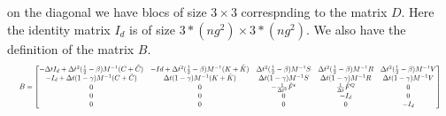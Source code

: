 on the diagonal we have blocs of size  $3 \times 3$ correspnding to the matrix $D$. Here the identity matrix $I_d$ is of size $3*(ng^2) \times 3*(ng^2)$.
We also have the definition of the matrix $B$.
\begin{equation}
\resizebox{\columnwidth}{!}{
$
B = \begin{bmatrix}
 - \Delta t I_d + \Delta t^2 (\frac{1}{2} - \beta) M^{-1} (C+\tilde{C}) & - Id + \Delta t^2 (\frac{1}{2} - \beta) M^{-1}(K+\tilde{K}) & \Delta t^2 (\frac{1}{2} - \beta) M^{-1} S & \Delta t^2 (\frac{1}{2} - \beta) M^{-1} R & \Delta t^2 (\frac{1}{2} - \beta) M^{-1} V \\
-I_d + \Delta t (1-\gamma) M^{-1} (C+\tilde{C})& \Delta t (1-\gamma) M^{-1} (K+\tilde{K}) & \Delta t (1-\gamma) M^{-1} S& \Delta t (1-\gamma) M^{-1} R & \Delta t (1-\gamma) M^{-1} V \\
0 & 0 & -\frac{1}{\Delta t^2}\hat{F}^\epsilon & \frac{1}{\Delta t} \hat{F}^Q & 0 \\
0 & 0 & 0 & -I_d & 0 \\
0 & 0 & 0 & 0 & -I_d 
\end{bmatrix}
$
}
\label{eq:B}
\end{equation}



